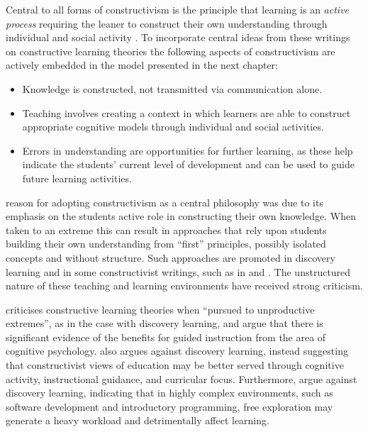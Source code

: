 %
%

Central to all forms of constructivism is the principle that learning is an \emph{active process} requiring the leaner to construct their own understanding through individual and social activity \cite{Biggs:1996c,Cobb:1994,Duffy:1996,Duffy:1992,Glasersfeld:1989,Jonassen:1991,Steffe:1995,Vrasidas:2000}. To incorporate central ideas from these writings on constructive learning theories the following aspects of constructivism are actively embedded in the model presented in the next chapter:

\begin{itemize}[noitemsep,nolistsep]
	\item Knowledge is constructed, not transmitted via communication alone.
	\item Teaching involves creating a context in which learners are able to construct appropriate cognitive models through individual and social activities.
	\item Errors in understanding are opportunities for further learning, as these help indicate the students' current level of development and can be used to guide future learning activities.
\end{itemize}

\citet{Biggs:1996c} reason for adopting constructivism as a central philosophy was due to its emphasis on the students active role in constructing their own knowledge. When taken to an extreme this can result in approaches that rely upon students building their own understanding from ``first'' principles, possibly isolated concepts and without structure. Such approaches are promoted in discovery learning \cite{Bruner:1961} and in some constructivist writings, such as in \citet{Glasersfeld:1989} and \citet{Duffy:1996}. The unstructured nature of these teaching and learning environments have received strong criticism. 

\citet{Anderson:1998} criticises constructive learning theories when ``pursued to unproductive extremes'', as in the case with discovery learning, and argue that there is significant evidence of the benefits for guided instruction from the area of cognitive psychology. \citet{Mayer:2004} also argues against discovery learning, instead suggesting that constructivist views of education may be better served through cognitive activity, instructional guidance, and curricular focus. Furthermore, \citet{Kirschner:2006} argue against discovery learning, indicating that in highly complex environments, such as software development and introductory programming, free exploration may generate a heavy workload and detrimentally affect learning. 

